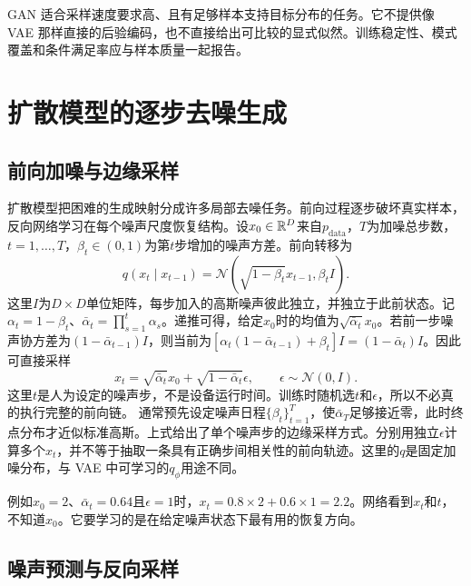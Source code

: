 GAN 适合采样速度要求高、且有足够样本支持目标分布的任务。它不提供像 VAE 那样直接的后验编码，也不直接给出可比较的显式似然。训练稳定性、模式覆盖和条件满足率应与样本质量一起报告。

\section{扩散模型的逐步去噪生成}

\subsection{前向加噪与边缘采样}

扩散模型把困难的生成映射分成许多局部去噪任务。前向过程逐步破坏真实样本，反向网络学习在每个噪声尺度恢复结构。设$x_0\in\mathbb{R}^D$来自$p_{\mathrm{data}}$，$T$为加噪总步数，$t=1,\ldots,T$，$\beta_t\in(0,1)$为第$t$步增加的噪声方差。前向转移为
\begin{equation}
q(x_t\mid x_{t-1})=\mathcal N(\sqrt{1-\beta_t}x_{t-1},\beta_tI).
\end{equation}
这里$I$为$D\times D$单位矩阵，每步加入的高斯噪声彼此独立，并独立于此前状态。记$\alpha_t=1-\beta_t$、$\bar\alpha_t=\prod_{s=1}^t\alpha_s$。递推可得，给定$x_0$时的均值为$\sqrt{\bar\alpha_t}x_0$。若前一步噪声协方差为$(1-\bar\alpha_{t-1})I$，则当前为$[\alpha_t(1-\bar\alpha_{t-1})+\beta_t]I=(1-\bar\alpha_t)I$。因此可直接采样
\begin{equation}
x_t=\sqrt{\bar\alpha_t}x_0+\sqrt{1-\bar\alpha_t}\epsilon,
\qquad \epsilon\sim\mathcal N(0,I).
\label{eq:generative-direct-noising}
\end{equation}
这里$t$是人为设定的噪声步，不是设备运行时间。训练时随机选$t$和$\epsilon$，所以不必真的执行完整的前向链。
通常预先设定噪声日程$\{\beta_t\}_{t=1}^T$，使$\bar\alpha_T$足够接近零，此时终点分布才近似标准高斯。上式给出了单个噪声步的边缘采样方式。分别用独立$\epsilon$计算多个$x_t$，并不等于抽取一条具有正确步间相关性的前向轨迹。这里的$q$是固定加噪分布，与 VAE 中可学习的$q_{\phi}$用途不同。

例如$x_0=2$、$\bar\alpha_t=0.64$且$\epsilon=1$时，$x_t=0.8\times2+0.6\times1=2.2$。网络看到$x_t$和$t$，不知道$x_0$。它要学习的是在给定噪声状态下最有用的恢复方向。

\subsection{噪声预测与反向采样}

